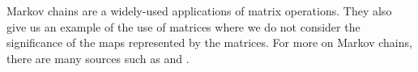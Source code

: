 \begin{center}
\begin{tabular}{@{}r|c@{\markovspacer}c@{\markovspacer}c@{\markovspacer}c@{\markovspacer}c@{\markovspacer}c@{\markovspacer}c@{\markovspacer}c@{}}
\end{tabular}
\end{center}

Markov chains are a 
widely-used applications of matrix operations.
They also  give us 
an example of the use of matrices where we do not consider
the significance of the maps represented by the matrices.
For more on Markov chains, there are many sources such as
\cite{KemenySnell} and \cite{Iosifescu}.

